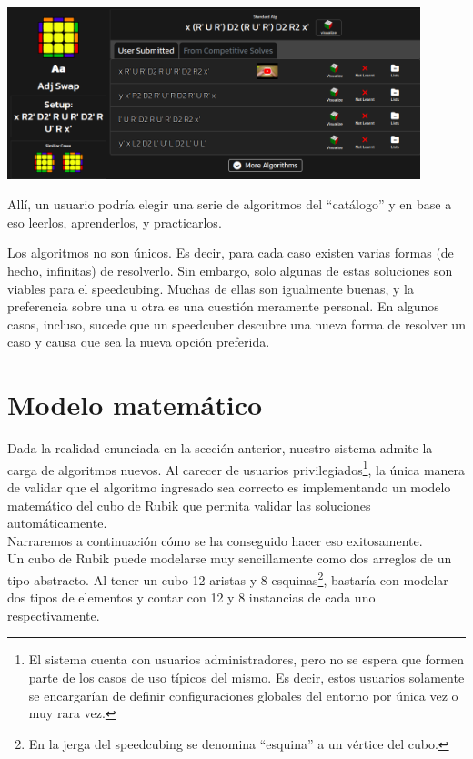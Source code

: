 \begin{multicols}{2}
\begin{Figure}
\centering
    \includegraphics[width=0.9\textwidth]{img/aperm-speedcubedb.png}
 \label{fig:aperm-speedcubedb}
\end{Figure}

Allí, un usuario podría elegir una serie de algoritmos del ``catálogo'' y en base a eso leerlos, aprenderlos, y practicarlos.

Los algoritmos no son únicos. Es decir, para cada caso existen varias formas (de hecho, infinitas) de resolverlo. Sin embargo, solo algunas de estas soluciones son viables para el speedcubing. Muchas de ellas son igualmente buenas, y la preferencia sobre una u otra es una cuestión meramente personal.
En algunos casos, incluso, sucede que un speedcuber descubre una nueva forma de resolver un caso y causa que sea la nueva opción preferida.

\section{Modelo matemático}

Dada la realidad enunciada en la sección anterior, nuestro sistema admite la carga de algoritmos nuevos. Al carecer de usuarios privilegiados\footnote{El sistema cuenta con usuarios administradores, pero no se espera que formen parte de los casos de uso típicos del mismo. Es decir, estos usuarios solamente se encargarían de definir configuraciones globales del entorno por única vez o muy rara vez.}, la única manera de validar que el algoritmo ingresado sea correcto es implementando un modelo matemático del cubo de Rubik que permita validar las soluciones automáticamente.\\

Narraremos a continuación cómo se ha conseguido hacer eso exitosamente.\\

Un cubo de Rubik puede modelarse muy sencillamente como dos arreglos de un tipo abstracto. Al tener un cubo 12 aristas y 8 esquinas\footnote{En la jerga del speedcubing se denomina ``esquina'' a un vértice del cubo.}, bastaría con modelar dos tipos de elementos y contar con 12 y 8 instancias de cada uno respectivamente.\\


\end{multicols}
